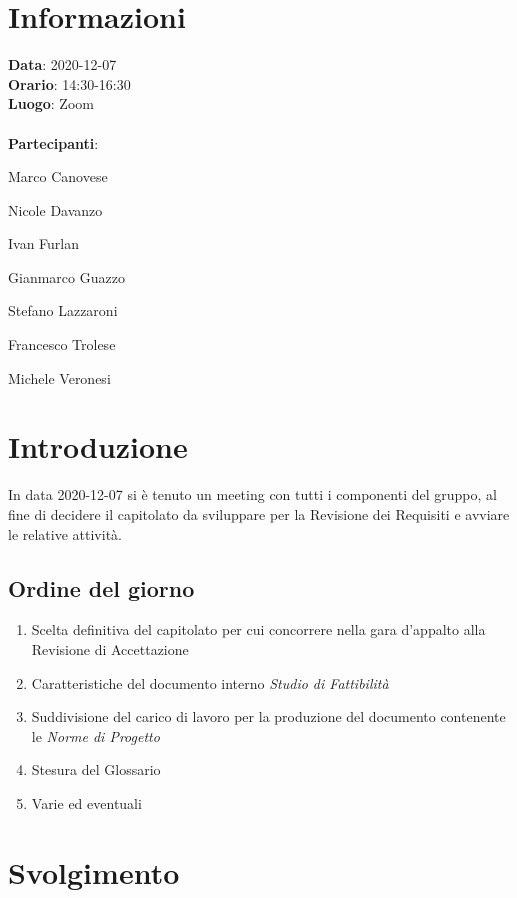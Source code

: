 \section{Informazioni}
\textbf{Data}: 2020-12-07\\
\textbf{Orario}: 14:30-16:30\\
\textbf{Luogo}: Zoom\\\\
\textbf{Partecipanti}:\begin{list}{*}{\setlength{\itemsep}{0cm}}
	\item Marco Canovese
	\item Nicole Davanzo
	\item Ivan Furlan
	\item Gianmarco Guazzo
	\item Stefano Lazzaroni
	\item Francesco Trolese
	\item Michele Veronesi
\end{list}

\section{Introduzione}
In data 2020-12-07 si è tenuto un meeting con tutti i componenti del gruppo, al fine
di decidere il capitolato da sviluppare per la Revisione dei Requisiti e avviare le relative attività.

\subsection{Ordine del giorno}
\begin{enumerate}
    \item Scelta definitiva del capitolato per cui concorrere nella gara d'appalto alla Revisione di Accettazione
    \item Caratteristiche del documento interno \textit{Studio di Fattibilità}
    \item Suddivisione del carico di lavoro per la produzione del documento contenente le \textit{Norme di Progetto}
    \item Stesura del Glossario
    \item Varie ed eventuali
\end{enumerate}

\section{Svolgimento}
